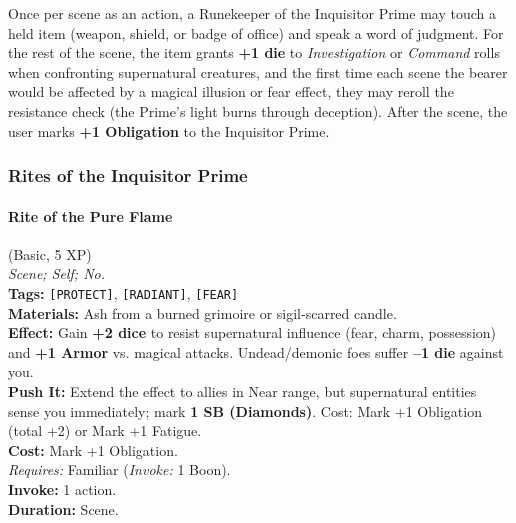 Once per scene as an action, a Runekeeper of the Inquisitor Prime may touch a held item (weapon, shield, or badge of office) and speak a word of judgment. For the rest of the scene, the item grants \textbf{+1 die} to \textit{Investigation} or \textit{Command} rolls when confronting supernatural creatures, and the first time each scene the bearer would be affected by a magical illusion or fear effect, they may reroll the resistance check (the Prime's light burns through deception). After the scene, the user marks \textbf{+1 Obligation} to the Inquisitor Prime.

\subsubsection*{Rites of the Inquisitor Prime}

\paragraph{Rite of the Pure Flame} (Basic, 5 XP) \hfill \\
\emph{Scene; Self; No.} \\
\textbf{Tags:} \texttt{[PROTECT]}, \texttt{[RADIANT]}, \texttt{[FEAR]} \\
\textbf{Materials:} Ash from a burned grimoire or sigil-scarred candle. \\
\textbf{Effect:} Gain \textbf{+2 dice} to resist supernatural influence (fear, charm, possession) and \textbf{+1 Armor} vs. magical attacks. Undead/demonic foes suffer \textbf{--1 die} against you. \\
\textbf{Push It:} Extend the effect to allies in Near range, but supernatural entities sense you immediately; mark \textbf{1 SB (Diamonds)}. Cost: Mark +1 Obligation (total +2) or Mark +1 Fatigue. \\
\textbf{Cost:} Mark +1 Obligation. \\
\textit{Requires:} Familiar (\textit{Invoke:} 1 Boon). \\
\textbf{Invoke:} 1 action. \\
\textbf{Duration:} Scene.

